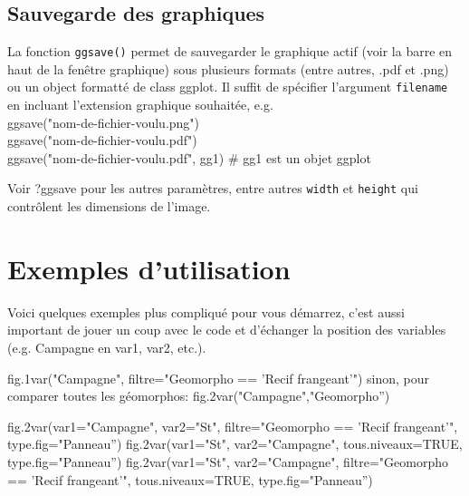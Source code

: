 \documentclass[12pt]{article}
\begin{document}
\subsection{Sauvegarde des graphiques}
La fonction \texttt{ggsave()} permet de sauvegarder le graphique actif (voir la barre en haut de la fenêtre graphique) sous plusieurs formats (entre autres, .pdf et .png) ou un object formatté de class ggplot. Il suffit de spécifier l'argument \texttt{filename} en incluant l'extension graphique souhaitée, e.g.\\
ggsave("nom-de-fichier-voulu.png")\\
ggsave("nom-de-fichier-voulu.pdf")\\
ggsave("nom-de-fichier-voulu.pdf", gg1) \# gg1 est un objet ggplot

Voir ?ggsave pour les autres paramètres, entre autres \texttt{width} et \texttt{height} qui contrôlent les dimensions de l'image. 

\section{Exemples d'utilisation}

Voici quelques exemples plus compliqué pour vous démarrez, c’est aussi important de jouer un coup avec le code et d’échanger la position des variables (e.g. Campagne en var1, var2, etc.).

fig.1var("Campagne", filtre="Geomorpho == 'Recif frangeant’")
sinon, pour comparer toutes les géomorphos: fig.2var("Campagne","Geomorpho”)

fig.2var(var1="Campagne", var2="St", filtre="Geomorpho == 'Recif frangeant'", type.fig="Panneau”)
fig.2var(var1="St", var2="Campagne", tous.niveaux=TRUE, type.fig="Panneau”)
fig.2var(var1="St", var2="Campagne", filtre="Geomorpho == 'Recif frangeant'", tous.niveaux=TRUE, type.fig="Panneau”)
\end{document}
